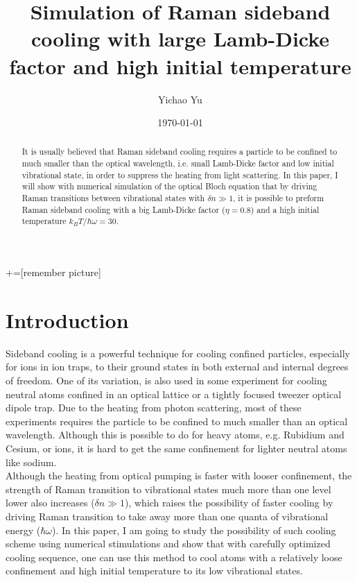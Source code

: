\documentclass[aps,twocolumn,secnumarabic,balancelastpage,amsmath,amssymb,nofootinbib]{revtex4}
\begin{document}
+=[remember picture]
\title{Simulation of Raman sideband cooling with large Lamb-Dicke factor and high initial temperature}
\author{Yichao Yu}
\date{\today}

\begin{abstract}
  It is usually believed that Raman sideband cooling requires a particle to be confined to much smaller than the optical wavelength, i.e. small Lamb-Dicke factor and low initial vibrational state, in order to suppress the heating from light scattering. In this paper, I will show with numerical simulation of the optical Bloch equation that by driving Raman transitions between vibrational states with $\delta n\gg1$, it is possible to preform Raman sideband cooling with a big Lamb-Dicke factor ($\eta=0.8$) and a high initial temperature $k_BT/\hbar\omega=30$.
\end{abstract}

\maketitle
\section{Introduction}
Sideband cooling is a powerful technique for cooling confined particles, especially for ions in ion traps, to their ground states in both external and internal degrees of freedom. One of its variation, is also used in some experiment for cooling neutral atoms confined in an optical lattice\cite{sideband-cs-lattice} or a tightly focused tweezer optical dipole trap\cite{sideband-single-jila,sideband-single-cua}. Due to the heating from photon scattering, most of these experiments requires the particle to be confined to much smaller than an optical wavelength. Although this is possible to do for heavy atoms, e.g. Rubidium and Cesium, or ions, it is hard to get the same confinement for lighter neutral atoms like sodium.\\

Although the heating from optical pumping is faster with looser confinement, the strength of Raman transition to vibrational states much more than one level lower also increases ($\delta n\gg1$), which raises the possibility of faster cooling by driving Raman transition to take away more than one quanta of vibrational energy ($\hbar\omega$). In this paper, I am going to study the possibility of such cooling scheme using numerical stimulations and show that with carefully optimized cooling sequence, one can use this method to cool atoms with a relatively loose confinement and high initial temperature to its low vibrational states.
\end{document}
